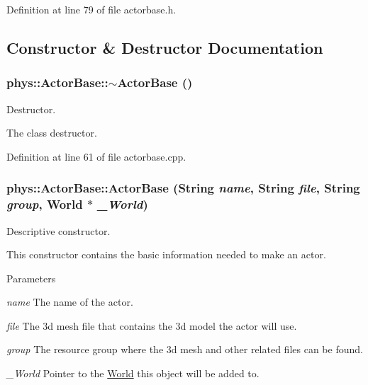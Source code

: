Definition at line 79 of file actorbase.h.



\subsection{Constructor \& Destructor Documentation}
\hypertarget{classphys_1_1ActorBase_a5e5d4b50c83c6851e554b5e7ad65403f}{
\subsubsection[{$\sim$ActorBase}]{\setlength{\rightskip}{0pt plus 5cm}phys::ActorBase::$\sim$ActorBase ()}}
\label{d8/d0f/classphys_1_1ActorBase_a5e5d4b50c83c6851e554b5e7ad65403f}


Destructor. 

The class destructor. 

Definition at line 61 of file actorbase.cpp.

\hypertarget{classphys_1_1ActorBase_ad9d90a68921ce81653e9950c1330809d}{
\subsubsection[{ActorBase}]{\setlength{\rightskip}{0pt plus 5cm}phys::ActorBase::ActorBase ({\bf String} {\em name}, \/  {\bf String} {\em file}, \/  {\bf String} {\em group}, \/  {\bf World} $\ast$ {\em \_\-World})}}
\label{d8/d0f/classphys_1_1ActorBase_ad9d90a68921ce81653e9950c1330809d}


Descriptive constructor. 

This constructor contains the basic information needed to make an actor. 
\begin{DoxyParams}{Parameters}
\item[{\em name}]The name of the actor. \item[{\em file}]The 3d mesh file that contains the 3d model the actor will use. \item[{\em group}]The resource group where the 3d mesh and other related files can be found. \item[{\em \_\-World}]Pointer to the \hyperlink{classphys_1_1World}{World} this object will be added to. \end{DoxyParams}


